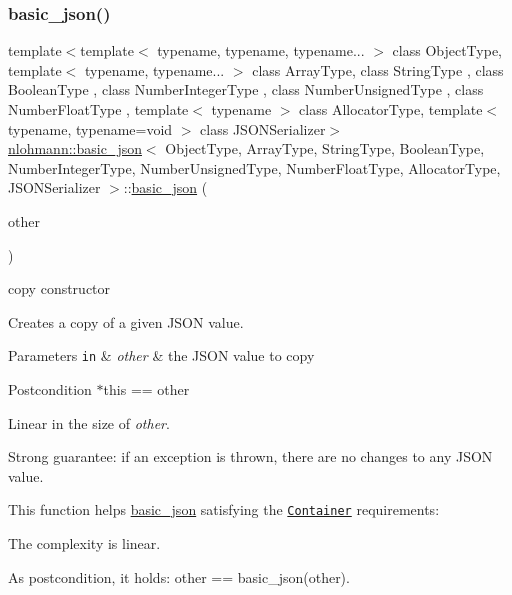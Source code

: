 \subsubsection{\texorpdfstring{basic\+\_\+json()}{basic\_json()}\hspace{0.1cm}{\footnotesize\ttfamily [8/9]}}
{\footnotesize\ttfamily template$<$template$<$ typename, typename, typename... $>$ class Object\+Type, template$<$ typename, typename... $>$ class Array\+Type, class String\+Type , class Boolean\+Type , class Number\+Integer\+Type , class Number\+Unsigned\+Type , class Number\+Float\+Type , template$<$ typename $>$ class Allocator\+Type, template$<$ typename, typename=void $>$ class J\+S\+O\+N\+Serializer$>$ \\
\hyperlink{classnlohmann_1_1basic__json}{nlohmann\+::basic\+\_\+json}$<$ Object\+Type, Array\+Type, String\+Type, Boolean\+Type, Number\+Integer\+Type, Number\+Unsigned\+Type, Number\+Float\+Type, Allocator\+Type, J\+S\+O\+N\+Serializer $>$\+::\hyperlink{classnlohmann_1_1basic__json}{basic\+\_\+json} (\begin{DoxyParamCaption}\item[{const \hyperlink{classnlohmann_1_1basic__json}{basic\+\_\+json}$<$ Object\+Type, Array\+Type, String\+Type, Boolean\+Type, Number\+Integer\+Type, Number\+Unsigned\+Type, Number\+Float\+Type, Allocator\+Type, J\+S\+O\+N\+Serializer $>$ \&}]{other }\end{DoxyParamCaption})\hspace{0.3cm}{\ttfamily [inline]}}



copy constructor 

Creates a copy of a given J\+S\+ON value.


\begin{DoxyParams}[1]{Parameters}
\mbox{\tt in}  & {\em other} & the J\+S\+ON value to copy\\
\hline
\end{DoxyParams}
\begin{DoxyPostcond}{Postcondition}
{\ttfamily $\ast$this == other}
\end{DoxyPostcond}
Linear in the size of {\itshape other}.

Strong guarantee\+: if an exception is thrown, there are no changes to any J\+S\+ON value.

This function helps {\ttfamily \hyperlink{classnlohmann_1_1basic__json}{basic\+\_\+json}} satisfying the \href{http://en.cppreference.com/w/cpp/concept/Container}{\tt Container} requirements\+:
\begin{DoxyItemize}
\item The complexity is linear.
\item As postcondition, it holds\+: {\ttfamily other == basic\+\_\+json(other)}.
\end{DoxyItemize}


